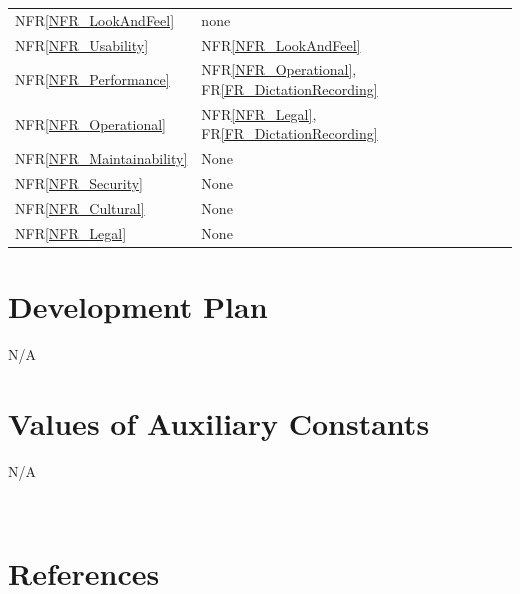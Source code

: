 \documentclass[12pt]{article}
\begin{document}
\begin{tabularx}{\textwidth}{p{3cm}p{2cm}X}
  NFR\ref{NFR_LookAndFeel} & none \\  

  NFR\ref{NFR_Usability} &  NFR\ref{NFR_LookAndFeel} \\  

  NFR\ref{NFR_Performance} & NFR\ref{NFR_Operational}, FR\ref{FR_DictationRecording} \\  

  NFR\ref{NFR_Operational} & NFR\ref{NFR_Legal}, FR\ref{FR_DictationRecording} \\  

  NFR\ref{NFR_Maintainability} & None \\  

  NFR\ref{NFR_Security} & None \\  

  NFR\ref{NFR_Cultural} & None \\  

  NFR\ref{NFR_Legal} & None \\ 

  \bottomrule 

  \end{tabularx} 
\section{Development Plan}
N/A

\section{Values of Auxiliary Constants}
N/A


~\newpage

\section{References}
\end{document}
